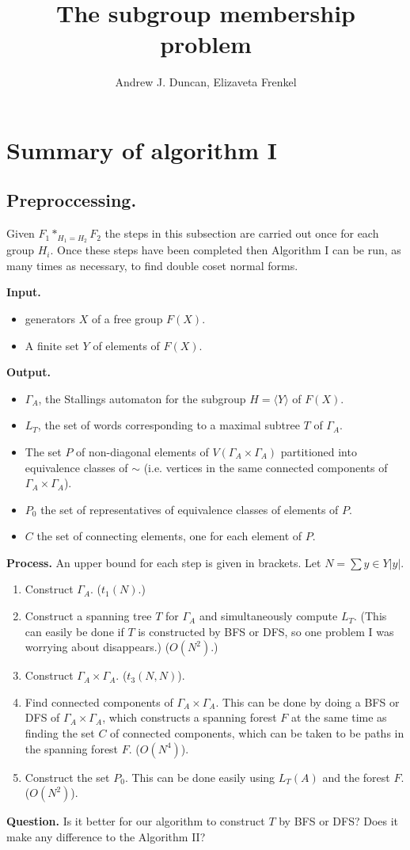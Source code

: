 \documentclass[a4paper,12pt]{article}
\title{The subgroup membership problem
}
\author{Andrew J. Duncan, Elizaveta Frenkel}
\newcommand{\G}{\Gamma }
\numberwithin{equation}{section}
\numberwithin{figure}{section}
\newcommand{\la}{\langle}
\newcommand{\ra}{\rangle}
\newcommand{\be}{\begin{enumerate}}
\newcommand{\ee}{\end{enumerate}}
\newcommand{\biz}{\begin{itemize}}
\newcommand{\eiz}{\end{itemize}}
\begin{document}
\section{Summary of algorithm I}
\subsection{Preproccessing.}
Given $F_1*_{H_1=H_2} F_2$
 the 
steps in this subsection are carried out once for 
each group $H_i$. Once these steps have been completed
then Algorithm I can be run, as many times as necessary,
to find double coset normal forms.
 
\noindent\textbf{Input.}
\biz
\item generators $X$ of a free group $F(X)$.
\item A finite set $Y$ of elements of $F(X)$.
\eiz
\noindent\textbf{Output.}
\biz
\item 
$\G_A$, the Stallings automaton for the subgroup $H=\la Y\ra$ of $F(X)$.
\item
$L_T$, the set of words corresponding to a  maximal subtree $T$ of $\G_A$.
\item The set $P$ of non-diagonal elements of $V( \G_A\times \G_A)$ 
partitioned into equivalence classes of $\sim$ (i.e. vertices in the
same connected components of $\G_A\times \G_A$).
\item $P_0$ the set of representatives of equivalence classes of 
elements of $P$.
\item $C$ the set of connecting elements, one for each element of $P$.
\eiz
\noindent\textbf{Process.}
An upper bound for each step is given in brackets.
Let $N=\sum{y\in Y} |y|$.
\be
\item Construct $\G_A$. ($t_1(N)$.)
\item Construct a spanning tree $T$ for $\G_A$ and simultaneously
compute $L_T$. (This can easily be done if $T$ is constructed by
BFS or DFS, so one problem I was worrying about disappears.) ($O(N^2)$.)
\item Construct $\G_A\times \G_A$. ($t_3(N,N)$).
\item Find connected components of $\G_A\times \G_A$. This can be
done by doing a BFS or DFS of $\G_A\times \G_A$, which constructs
a spanning forest $F$ at the same time as finding the set $C$ of
connected components,
which can be taken to be paths in the spanning forest $F$. 
($O(N^4)$).
\item Construct the set $P_0$. This can be done easily using $L_T(A)$ and
the forest $F$. ($O(N^2)$).  
\ee
\noindent\textbf{Question.} Is it better for our algorithm
to construct $T$ by BFS or DFS? Does it make any difference to the 
Algorithm II? 
\end{document}
